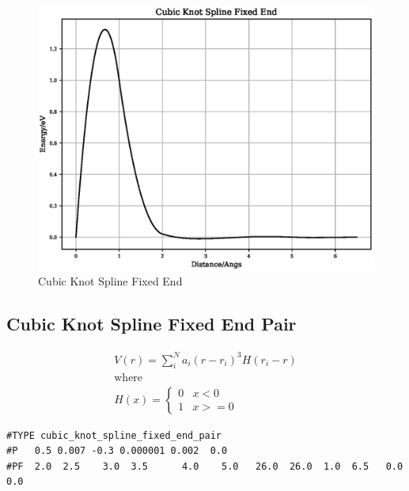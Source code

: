 \documentclass[12pt,twoside]{manual}
\begin{document}
\begin{appendices}
\FloatBarrier
\begin{figure}[h]
  \begin{center}
    \includegraphics[scale=0.5]{img/plots/cubic_knot_spline_fixed_end.eps}
    \caption{Cubic Knot Spline Fixed End}
    \label{graph:graph1}
  \end{center}
\end{figure}
\FloatBarrier







\subsection{Cubic Knot Spline Fixed End Pair}

\begin{equation}
\begin{split}
V(r) = \sum_i^N a_i (r - r_i)^3 H(r_i - r) \\
\text{where } \\
H(x) = \left\{ \begin{matrix} 0 & x<0 \\  1 & x >= 0 \end{matrix} \right . 
\end{split}
\label{eq:cubicKnotSplineFixedEndPair}
\end{equation}

\begin{lstlisting}[style=pseudocode,caption={Cubic Knot Spline Fixed End Pair}]
#TYPE cubic_knot_spline_fixed_end_pair
#P   0.5 0.007 -0.3 0.000001 0.002  0.0
#PF  2.0  2.5    3.0  3.5      4.0    5.0   26.0  26.0  1.0  6.5   0.0   0.0
\end{lstlisting}


\end{appendices}
\end{document}

